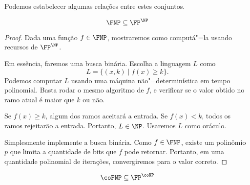 Podemos estabelecer algumas relações entre estes conjuntos.

\begin{theorem}
    \begin{equation*}
        \FNP \subseteq \FP^\NP
    \end{equation*}
\end{theorem}
\begin{proof}
    Dada uma função $f \in \FNP$,
    mostraremos como computá"=la usando recursos de $\FP^\NP$.

    Em essência, faremos uma busca binária.
    Escolha a linguagem $L$ como
    \begin{equation*}
        L = \{ (x, k) \mid f(x) \geq k \}.
    \end{equation*}
    Podemos computar $L$ usando uma máquina não"=determinística em tempo polinomial.
    Basta rodar o mesmo algoritmo de $f$,
    e verificar se o valor obtido no ramo atual
    é maior que $k$ ou não.

    Se $f(x) \geq k$,
    algum dos ramos aceitará a entrada.
    Se $f(x) < k$,
    todos os ramos rejeitarão a entrada.
    Portanto, $L \in \NP$.
    Usaremos $L$ como oráculo.

    Simplesmente implemente a busca binária.
    Como $f \in \FNP$,
    existe um polinômio $p$ que limita a quantidade de bits que $f$ pode retornar.
    Portanto,
    em uma quantidade polinomial de iterações,
    convergiremos para o valor correto.
\end{proof}

\begin{ucorollary}
    \begin{equation*}
        \coFNP \subseteq \FP^\coNP
    \end{equation*}
\end{ucorollary}
